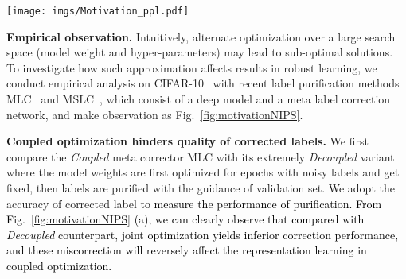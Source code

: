 \documentclass[10pt,twocolumn,letterpaper]{article}
\newcommand{\zbs}[1]{\textcolor{black}{#1}}
\newcommand{\lyx}[1]{\textcolor{black}{#1}}
\newcommand{\zbsN}[1]{\textcolor{black}{#1}}
\begin{document}
\begin{figure*}[!t]
\centering
\texttt{[image: imgs/Motivation\_ppl.pdf]}
\vspace{-1em}
\caption
    {
    \small
        \zbsN{The corrected label accuracy (a) and linear probe accuracy of representations (b) between coupled~\cite{zheng2021meta} and decoupled label correction schemes during training under 50\% and 90\% symmetric label noise on CIFAR-10. \zbs{(c) investigates the effect of representation
        learning on `Ori'-original coupled network training from scratch, `SimCLR-Coupled'-initialization with stronger self-supervised pretrained weights and `SimCLR-Decoupled'-further fix the pretrained backbone during label purification.}
        }  
} 
  \label{fig:motivationNIPS}

\end{figure*}







{\textbf{Empirical observation.} Intuitively, alternate optimization over a large search space (model weight and hyper-parameters) may lead to sub-optimal solutions. To investigate how such approximation affects results in robust learning, we conduct empirical analysis on CIFAR-10~\cite{datasetcifar10} with recent label purification methods MLC~\cite{zheng2021meta} and MSLC~\cite{AAAI-2021-meta}, which consist of a deep model and a meta label correction network, and make observation as Fig.~\ref{fig:motivationNIPS}.}

\noindent  \textbf{Coupled optimization hinders quality of corrected labels.} We first compare the \emph{Coupled} meta corrector MLC with its extremely \emph{Decoupled} variant where the model weights are first optimized for  epochs with noisy labels and get fixed, then labels are purified with the guidance of validation set. We adopt the accuracy of corrected label \lyx{to measure the performance of purification.} \zbsN{From Fig.~\ref{fig:motivationNIPS} (a), we can clearly observe that compared with \emph{Decoupled} counterpart, joint optimization yields inferior correction performance, and these miscorrection will reversely affect the representation learning in coupled optimization.}
\end{document}
